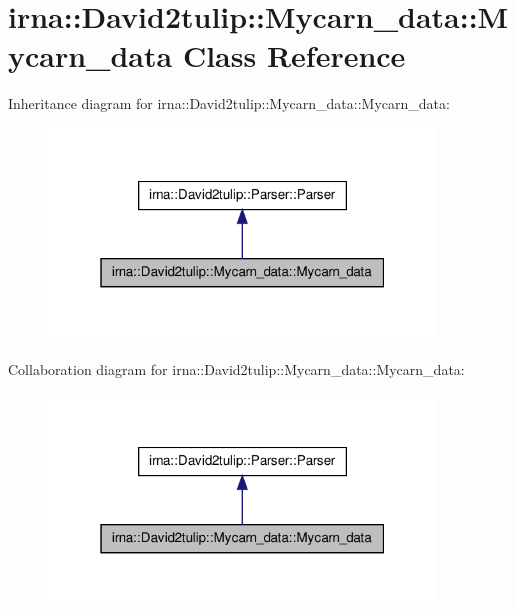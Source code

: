 \hypertarget{classirna_1_1David2tulip_1_1Mycarn__data_1_1Mycarn__data}{
\section{irna\-:\-:\-David2tulip\-:\-:\-Mycarn\-\_\-data\-:\-:\-Mycarn\-\_\-data \-Class \-Reference}
\label{classirna_1_1David2tulip_1_1Mycarn__data_1_1Mycarn__data}
}


\-Inheritance diagram for irna\-:\-:\-David2tulip\-:\-:\-Mycarn\-\_\-data\-:\-:\-Mycarn\-\_\-data\-:\nopagebreak
\begin{figure}[H]
\begin{center}
\leavevmode
\includegraphics[width=292pt]{classirna_1_1David2tulip_1_1Mycarn__data_1_1Mycarn__data__inherit__graph}
\end{center}
\end{figure}


\-Collaboration diagram for irna\-:\-:\-David2tulip\-:\-:\-Mycarn\-\_\-data\-:\-:\-Mycarn\-\_\-data\-:\nopagebreak
\begin{figure}[H]
\begin{center}
\leavevmode
\includegraphics[width=292pt]{classirna_1_1David2tulip_1_1Mycarn__data_1_1Mycarn__data__coll__graph}
\end{center}
\end{figure}
